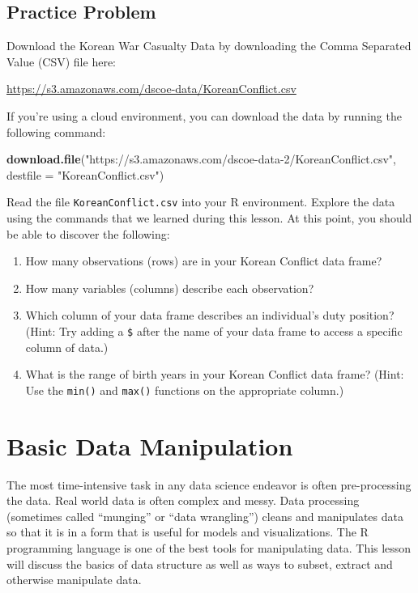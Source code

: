 \documentclass[]{book}
\newenvironment{Shaded}{\begin{snugshade}}{\end{snugshade}}
\newcommand{\KeywordTok}[1]{\textcolor[rgb]{0.13,0.29,0.53}{\textbf{{#1}}}}
\newcommand{\DataTypeTok}[1]{\textcolor[rgb]{0.13,0.29,0.53}{{#1}}}
\newcommand{\StringTok}[1]{\textcolor[rgb]{0.31,0.60,0.02}{{#1}}}
\newcommand{\NormalTok}[1]{{#1}}
\providecommand{\tightlist}{%
  \setlength{\itemsep}{0pt}\setlength{\parskip}{0pt}}
\begin{document}
\section{Practice Problem}\label{practice-problem}

Download the Korean War Casualty Data by downloading the Comma Separated
Value (CSV) file here:

\url{https://s3.amazonaws.com/dscoe-data/KoreanConflict.csv}

If you're using a cloud environment, you can download the data by
running the following command:

\begin{Shaded}
\begin{Highlighting}[]
\KeywordTok{download.file}\NormalTok{(}\StringTok{"https://s3.amazonaws.com/dscoe-data-2/KoreanConflict.csv"}\NormalTok{, }\DataTypeTok{destfile =} \StringTok{"KoreanConflict.csv"}\NormalTok{)}
\end{Highlighting}
\end{Shaded}

Read the file \texttt{KoreanConflict.csv} into your R environment.
Explore the data using the commands that we learned during this lesson.
At this point, you should be able to discover the following:

\begin{enumerate}
\def\labelenumi{\arabic{enumi}.}
\tightlist
\item
  How many observations (rows) are in your Korean Conflict data frame?
\item
  How many variables (columns) describe each observation?
\item
  Which column of your data frame describes an individual's duty
  position? (Hint: Try adding a \texttt{\$} after the name of your data
  frame to access a specific column of data.)
\item
  What is the range of birth years in your Korean Conflict data frame?
  (Hint: Use the \texttt{min()} and \texttt{max()} functions on the
  appropriate column.)
\end{enumerate}

\chapter{Basic Data Manipulation}\label{basic-data-manipulation}

The most time-intensive task in any data science endeavor is often
pre-processing the data. Real world data is often complex and messy.
Data processing (sometimes called ``munging'' or ``data wrangling'')
cleans and manipulates data so that it is in a form that is useful for
models and visualizations. The R programming language is one of the best
tools for manipulating data. This lesson will discuss the basics of data
structure as well as ways to subset, extract and otherwise manipulate
data.
\end{document}
